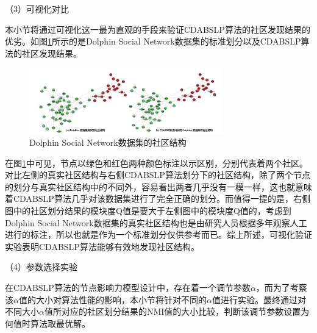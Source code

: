 （3）可视化对比

本小节将通过可视化这一最为直观的手段来验证CDABSLP算法的社区发现结果的优劣。如图\ref{fig:Dolphins}所示的是Dolphin Social Network数据集的标准划分以及CDABSLP算法的社区发现结果。

\begin{figure}
  \centering
  \includegraphics[width=0.75\textwidth]{figures/Dolphins}
  \caption{Dolphin Social Network数据集的社区结构}\label{fig:Dolphins}
\end{figure}

在图\ref{fig:Dolphins}中可见，节点以绿色和红色两种颜色标注以示区别，分别代表着两个社区。对比左侧的真实社区结构与右侧CDABSLP算法划分下的社区结构，除了两个节点的划分与真实社区结构中的不同外，容易看出两者几乎没有一模一样，这也就意味着CDABSLP算法几乎对该数据集进行了完全正确的划分。而值得一提的是，右侧图中的社区划分结果的模块度Q值是要大于左侧图中的模块度Q值的，考虑到Dolphin Social Network数据集的真实社区结构也是由研究人员根据多年观察人工进行的标注，所以也就是作为一个标准划分仅供参考而已。综上所述，可视化验证实验表明CDABSLP算法能够有效地发现社区结构。

（4）参数选择实验

在CDABSLP算法的节点影响力模型设计中，存在着一个调节参数$\alpha$，而为了考察该$\alpha$值的大小对算法性能的影响，本小节将针对不同的$\alpha$值进行实验。最终通过对不同大小$\alpha$值所对应的社区划分结果的NMI值的大小比较，判断该调节参数设置为何值时算法取最优解。

